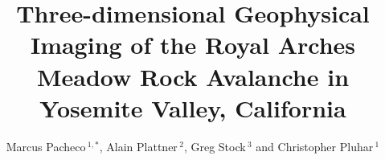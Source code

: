 \documentclass[utf8]{frontiersSCNS}
\def\firstAuthorLast{Pacheco {et~al.}} %
\def\Authors{Marcus Pacheco\,$^{1,*}$, Alain Plattner\,$^{2}$, Greg Stock\,$^{3}$ and Christopher Pluhar\,$^{1}$}
\begin{document}
\onecolumn
{}


\title[Royal Arches Meadow rock avalanche]{Three-dimensional Geophysical Imaging of the Royal Arches Meadow Rock Avalanche in Yosemite Valley, California}

\author[\firstAuthorLast ]{\Authors} %
\address{} %
\correspondance{} %

\extraAuth{}%





\end{document}
